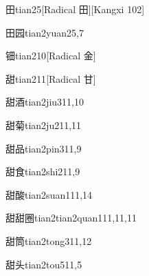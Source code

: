 \begin{verbete}{田}{tian2}{5}[Radical 田][Kangxi 102]
\end{verbete}

\begin{verbete}{田园}{tian2yuan2}{5,7}
\end{verbete}

\begin{verbete}{钿}{tian2}{10}[Radical 金]
\end{verbete}

\begin{verbete}{甜}{tian2}{11}[Radical 甘]
\end{verbete}

\begin{verbete}{甜酒}{tian2jiu3}{11,10}
\end{verbete}

\begin{verbete}{甜菊}{tian2ju2}{11,11}
\end{verbete}

\begin{verbete}{甜品}{tian2pin3}{11,9}
\end{verbete}

\begin{verbete}{甜食}{tian2shi2}{11,9}
\end{verbete}

\begin{verbete}{甜酸}{tian2suan1}{11,14}
\end{verbete}

\begin{verbete}{甜甜圈}{tian2tian2quan1}{11,11,11}
\end{verbete}

\begin{verbete}{甜筒}{tian2tong3}{11,12}
\end{verbete}

\begin{verbete}{甜头}{tian2tou5}{11,5}
\end{verbete}

